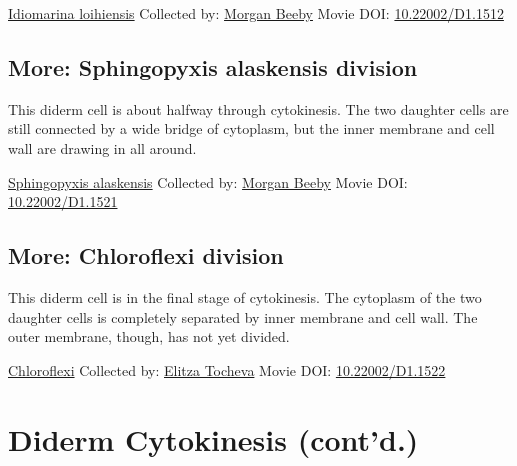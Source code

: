\documentclass[]{tufte-book}
\begin{document}
\hypertarget{htmlwidget-d6d31b1ffe8a337f28a6}{}

\label{fig:5-6}\protect\hyperlink{tree}{Idiomarina loihiensis} Collected by: \protect\hyperlink{morgan_beeby}{Morgan Beeby} Movie DOI: \href{https://doi.org/10.22002/D1.1512}{10.22002/D1.1512}

\hypertarget{Sphingopyxis_alaskensis_division}{%
\subsection*{More: Sphingopyxis alaskensis division}\label{Sphingopyxis_alaskensis_division}}

This diderm cell is about halfway through cytokinesis. The two daughter cells are still connected by a wide bridge of cytoplasm, but the inner membrane and cell wall are drawing in all around.



\hypertarget{htmlwidget-71713646ebdbd35707b2}{}

\label{fig:5-6a}\protect\hyperlink{tree}{Sphingopyxis alaskensis} Collected by: \protect\hyperlink{morgan_beeby}{Morgan Beeby} Movie DOI: \href{https://doi.org/10.22002/D1.1521}{10.22002/D1.1521}

\hypertarget{Chloroflexi_division}{%
\subsection*{More: Chloroflexi division}\label{Chloroflexi_division}}

This diderm cell is in the final stage of cytokinesis. The cytoplasm of the two daughter cells is completely separated by inner membrane and cell wall. The outer membrane, though, has not yet divided.



\hypertarget{htmlwidget-c46e91c7ec8f0e6a9926}{}

\label{fig:5-6b}\protect\hyperlink{tree}{Chloroflexi} Collected by: \protect\hyperlink{elitza_tocheva}{Elitza Tocheva} Movie DOI: \href{https://doi.org/10.22002/D1.1522}{10.22002/D1.1522}

\hypertarget{diderm-cytokinesis-contd.}{%
\section{Diderm Cytokinesis (cont'd.)}\label{diderm-cytokinesis-contd.}}
\end{document}
